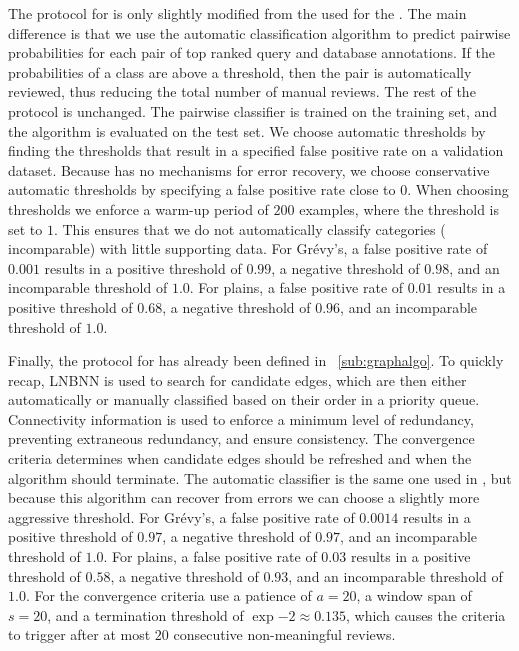     The protocol for  is only slightly modified from the used for the .
    The main difference is that we use the automatic classification algorithm to predict pairwise probabilities
      for each pair of top ranked query and database annotations.
    If the probabilities of a class are above a threshold, then the pair is automatically reviewed, thus reducing
      the total number of manual reviews.
    The rest of the protocol is unchanged.
    The pairwise classifier is trained on the training set, and the algorithm is evaluated on the test set.
    We choose automatic thresholds by finding the thresholds that result in a specified false positive rate on a
      validation dataset.
    Because  has no mechanisms for error recovery, we choose conservative automatic thresholds by
      specifying a false positive rate close to $0$.
    When choosing thresholds we enforce a warm-up period of $200$ examples, where the threshold is set to $1$.
    This ensures that we do not automatically classify categories (\eg{} incomparable) with little supporting
      data.
    For Grévy's, a false positive rate of $0.001$ results in a positive threshold of $0.99$, a negative threshold
      of $0.98$, and an incomparable threshold of $1.0$.
    For plains, a false positive rate of $0.01$ results in a positive threshold of $0.68$, a negative threshold
      of $0.96$, and an incomparable threshold of $1.0$.


    Finally, the protocol for  has already been defined in ~\cref{sub:graphalgo}.
    To quickly recap, LNBNN is used to search for candidate edges, which are then either automatically or
      manually classified based on their order in a priority queue.
    Connectivity information is used to enforce a minimum level of redundancy, preventing extraneous redundancy,
      and ensure consistency.
    The convergence criteria determines when candidate edges should be refreshed and when the algorithm should
      terminate.
    The automatic classifier is the same one used in , but because this algorithm can recover from
      errors we can choose a slightly more aggressive threshold.
    For Grévy's, a false positive rate of $0.0014$ results in a positive threshold of $0.97$, a negative
      threshold of $0.97$, and an incomparable threshold of $1.0$.
    For plains, a false positive rate of $0.03$ results in a positive threshold of $0.58$, a negative threshold
      of $0.93$, and an incomparable threshold of $1.0$.
    For the convergence criteria use a patience of $a=20$, a window span of $s=20$, and a termination threshold
      of $\exp{-2}\approx0.135$, which causes the criteria to trigger after at most $20$ consecutive non-meaningful
      reviews.

